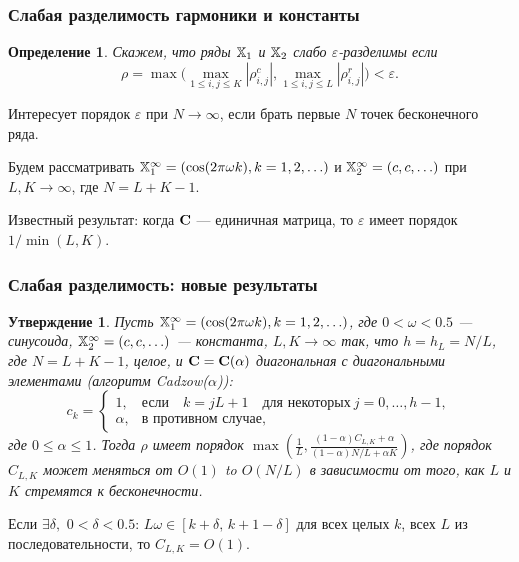 \documentclass[unicode, notheorems]{beamer}
\newtheorem{definition}{Определение}
\newtheorem{proposition}{Утверждение}
\begin{document}
\begin{frame}
	\frametitle{Слабая разделимость гармоники и константы}
	\begin{definition}
		Скажем, что ряды $\mathbb{X}_1$ и $\mathbb{X}_2$ \emph{слабо $\varepsilon$-разделимы} если
		\begin{equation*}
			\rho = \max\Big(\max_{1 \le i,j \le K}|\rho^c_{i,j}|, \max_{1 \le i,j \le L}|\rho^r_{i,j}|\Big) < \varepsilon.
		\end{equation*}
	\end{definition}
	Интересует порядок $\varepsilon$ при $N \to \infty$, если брать первые $N$ точек бесконечного ряда.
	
	Будем рассматривать $\mathbb{X}_1^\infty = (\cos(2 \pi \omega k), k = 1, 2, \ldots)$ и $\mathbb{X}_2^\infty = (c, c, \ldots)$ при $L, K \to \infty$, где $N = L + K - 1$.
	
	\vspace{0.3cm}
	Известный результат: когда $\mathbf{C}$ --- единичная матрица, то $\varepsilon$ имеет порядок $1/\min(L,K)$.
\end{frame}

\begin{frame}
	\frametitle{Слабая разделимость: новые результаты}
\begin{proposition}
	Пусть $\mathbb{X}_1^\infty = (\cos(2 \pi \omega k), k = 1, 2, \ldots)$, где $0<\omega <0.5$ --- синусоида, $\mathbb{X}_2^\infty = (c, c, \ldots)$ --- константа,  $L,K \to \infty$ так, что $h = h_L = N/L$, где $N=L+K-1$, целое, и $\mathbf{C}=\mathbf{C}(\alpha)$ диагональная с диагональными элементами (алгоритм Cadzow($\alpha$)):
	\begin{equation*}
	c_k = \begin{cases}
	1, & \text{если} \quad k = jL+1 \quad \text{для некоторых} \ j = 0, \ldots, h-1,\\
	\alpha, & \text{в противном случае},
	\end{cases}
	\end{equation*}
	где $0 \le \alpha \le 1$. Тогда $\rho$ имеет порядок $\max\left(\frac{1}{L}, \frac{(1-\alpha)C_{L,K}+\alpha}{(1-\alpha)N/L+\alpha K}\right)$, где порядок $C_{L,K}$
	может меняться от $O(1)$ to $O(N/L)$ в зависимости от того, как $L$ и $K$ стремятся к бесконечности.
	\end{proposition}
    \small Если $\exists \delta,$ $0 < \delta < 0.5$: $L \omega \in [k + \delta, \, k + 1 - \delta]$ для всех целых $k$, всех $L$ из последовательности, то $C_{L, K} = O(1)$.
\end{frame}
\end{document}
